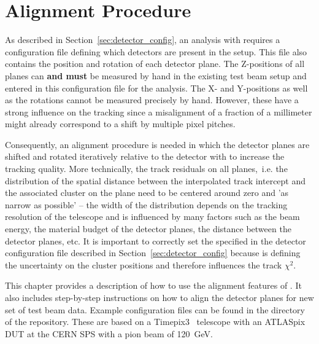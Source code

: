 \chapter{Alignment Procedure}
\label{ch:howtoalign}

As described in Section~\ref{sec:detector_config}, an analysis with \corry requires a configuration file defining which detectors are present in the setup.
This file also contains the position and rotation of each detector plane.
The Z-positions of all planes can \textbf{and must} be measured by hand in the existing test beam setup and entered in this configuration file for the analysis.
The X- and Y-positions as well as the rotations cannot be measured precisely by hand.
However, these have a strong influence on the tracking since a misalignment of a fraction of a millimeter might already correspond to a shift by multiple pixel pitches.

Consequently, an alignment procedure is needed in which the detector planes are shifted and rotated iteratively relative to the detector with  to increase the tracking quality.
More technically, the track residuals on all planes,~i.e. the distribution of the spatial distance between the interpolated track intercept and the associated cluster on the plane need to be centered around zero and 'as narrow as possible' -- the width of the distribution depends on the tracking resolution of the telescope and is influenced by many factors such as the beam energy, the material budget of the detector planes, the distance between the detector planes, etc.
It is important to correctly set the  specified in the detector configuration file described in Section~\ref{sec:detector_config} because is defining the uncertainty on the cluster positions and therefore influences the track $\chi^2$.

This chapter provides a description of how to use the alignment features of \corry.
It also includes step-by-step instructions on how to align the detector planes for new set of test beam data.
Example configuration files can be found in the  directory of the repository.
These are based on a Timepix3~\cite{timepix3} telescope with an ATLASpix~\cite{atlaspix} DUT at the CERN SPS with a pion beam of \SI{120}{GeV}.

